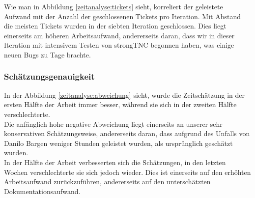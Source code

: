 Wie man in Abbildung \ref{zeitanalyse:tickets} sieht, korreliert der geleistete
Aufwand mit der Anzahl der geschlossenen Tickets pro Iteration. Mit
Abstand die meisten Tickets wurden in der siebten Iteration geschlossen. Dies
liegt einerseits am höheren Arbeitsaufwand, andererseits daran, dass wir in
dieser Iteration mit intensivem Testen von strongTNC begonnen haben, was einige
neuen Bugs zu Tage brachte.

\subsubsection{Schätzungsgenauigkeit}

In der Abbildung \ref{zeitanalyse:abweichung} sieht, wurde die Zeitschätzung in
der ersten Hälfte der Arbeit immer besser, während sie sich in der zweiten Hälfte verschlechterte. \\
Die anfänglich hohe negative Abweichung liegt einerseits an unserer sehr
konservativen Schätzungsweise, andererseits daran, dass aufgrund des Unfalls von
Danilo Bargen weniger Stunden geleistet wurden, als ursprünglich geschätzt
wurden. \\
In der Hälfte der Arbeit verbesserten sich die Schätzungen, in den letzten
Wochen verschlechterte sie sich jedoch wieder. Dies ist einerseits auf den
erhöhten Arbeitsaufwand zurückzuführen, andererseits auf den unterschätzten
Dokumentationsaufwand.

